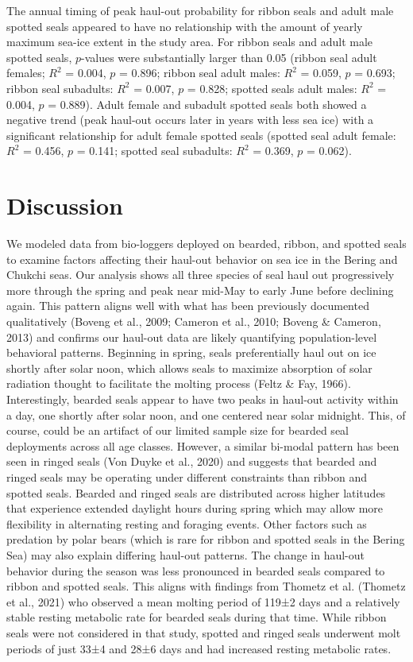 \documentclass[fleqn,10pt,lineno]{wlpeerj} %
\begin{document}
The annual timing of peak haul-out probability for ribbon seals and adult
male spotted seals appeared to have
no relationship with the amount of yearly maximum sea-ice extent in the
study area. For ribbon seals and adult male spotted seals,
\(p\)-values were substantially larger than 0.05 (ribbon seal adult
females; \(R^{2}\) = 0.004, \(p\) = 0.896;
ribbon seal adult males: \(R^{2}\) = 0.059, \(p\) =
0.693; ribbon seal subadults: \(R^{2}\) =
0.007, \(p\) = 0.828; spotted seals
adult males: \(R^{2}\) = 0.004, \(p\) =
0.889). Adult female and subadult spotted seals both
showed a negative trend (peak haul-out occurs later in years with less
sea ice) with a significant relationship for adult female spotted seals
(spotted seal adult female: \(R^{2}\) =
0.456, \(p\) = 0.141; spotted seal
subadults: \(R^{2}\) = 0.369, \(p\) =
0.062).

\section*{Discussion}\label{discussion}

We modeled data from bio-loggers deployed on bearded, ribbon, and spotted seals
to examine factors affecting their haul-out behavior on sea ice in the Bering
and Chukchi seas. Our analysis shows all three species of seal haul out
progressively more through the spring and peak near mid-May to early June before
declining again. This pattern aligns well with what has been previously
documented qualitatively (Boveng et al., 2009; Cameron et al., 2010; Boveng \& Cameron, 2013) and confirms
our haul-out data are likely quantifying population-level behavioral patterns.
Beginning in spring, seals preferentially haul out on ice shortly after solar
noon, which allows seals to maximize absorption of solar radiation thought to
facilitate the molting process (Feltz \& Fay, 1966). Interestingly, bearded seals appear
to have two peaks in haul-out activity within a day, one shortly after solar
noon, and one centered near solar midnight. This, of course, could be an
artifact of our limited sample size for bearded seal deployments across all age
classes. However, a similar bi-modal pattern has been seen in ringed seals
(Von Duyke et al., 2020) and suggests that bearded and ringed seals may be operating
under different constraints than ribbon and spotted seals. Bearded and ringed
seals are distributed across higher latitudes that experience
extended daylight hours during spring which may allow more flexibility in
alternating resting and foraging events. Other factors such as predation by
polar bears (which is rare for ribbon and spotted seals in the Bering Sea) may
also explain differing haul-out patterns. The change in haul-out behavior during
the season was less pronounced in bearded seals compared to ribbon and spotted
seals. This aligns with findings from Thometz et al. (Thometz et al., 2021) who observed
a mean molting period of 119±2 days and a relatively stable resting metabolic
rate for bearded seals during that time. While ribbon seals were not considered
in that study, spotted and ringed seals underwent molt periods of just 33±4
and 28±6 days and had increased resting metabolic rates.
\end{document}
